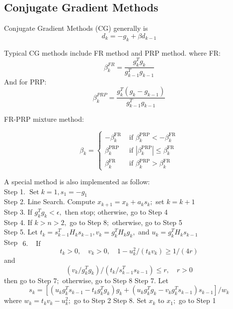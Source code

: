 \documentclass{article}
\begin{document}
\subsection{Conjugate Gradient Methods}
Conjugate Gradient Methods (CG) generally is 
\begin{equation}
d_{k} = -g_k + \beta d_{k-1}
\end{equation}

Typical CG methods include FR method and PRP method.
where FR:
\begin{equation}
\beta_{k}^{FR}=\frac{g_{k}^{T} g_{k}}{g_{k-1}^{T} g_{k-1}}
\end{equation}
And for PRP:
\begin{equation}
\beta_{k}^{PRP}=\frac{g_{k}^{T} (g_{k} - g_{k-1})}{g_{k-1}^{T} g_{k-1}}
\end{equation}

FR-PRP mixture method:

\begin{equation}
\beta_{k}=\left\{\begin{array}{ll}
-\beta_{k}^{\mathrm{FR}} & \text { if } \beta_{k}^{\mathrm{PRP}}<-\beta_{k}^{\mathrm{FR}} \\
\beta_{k}^{\mathrm{PRP}} & \text { if }\left|\beta_{k}^{\mathrm{PRP}}\right| \leq \beta_{k}^{\mathrm{FR}} \\
\beta_{k}^{\mathrm{FR}} & \text { if } \beta_{k}^{\mathrm{PRP}}>\beta_{k}^{\mathrm{FR}}
\end{array}\right.
\end{equation}

A special method is also implemented as follow: \\
Step 1. $\operatorname{Set} k=1, s_{1}=-g_{1}$ \\
Step 2. Line Search. Compute $x_{k+1}=x_{k}+a_{k} s_{k} ;$ set $k=k+1$ \\
Step 3. If $g_{k}^{T} g_{k}<\epsilon,$ then stop; otherwise, go to Step 4 \\
Step 4. If $k>n>2,$ go to Step $8 ;$ otherwise, go to Step 5 \\
Step 5. Let $t_{k}=s_{k-1}^{T} H_{k} s_{k-1}, v_{k}=g_{k}^{T} H_{k} g_{k},$ and $u_{k}=g_{k}^{T} H_{k} s_{k-1}$ \\

Step
$\begin{array}{ll}6 . & \text { If }\end{array}$
\[
t_{k}>0, \quad v_{k}>0, \quad 1-u_{k}^{2} /\left(t_{k} v_{k}\right) \geq 1 /(4 r)
\]
and
\[
\left(v_{k} / g_{k}^{T} g_{k}\right) /\left(t_{k} / s_{k-1}^{T} s_{k-1}\right) \leq r, \quad r>0
\]
then go to Step $7 ;$ otherwise, go to Step 8
Step
7. Let
\[
s_{k}=\left[\left(u_{k} g_{k}^{T} s_{k-1}-t_{k} g_{k}^{T} g_{k}\right) g_{k}+\left(u_{k} g_{k}^{T} g_{k}-v_{k} g_{k}^{T} s_{k-1}\right) s_{k-1}\right] / w_{k}
\]
where $w_{k}=t_{k} v_{k}-u_{k}^{2} ;$ go to Step 2
Step $8 .$ Set $x_{k}$ to $x_{1} ;$ go to Step 1
\end{document}
